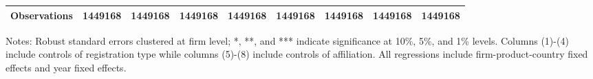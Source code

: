 \begin{table}
\begin{threeparttable}
\begin{tabular}{lcccccccc}
			Observations & 1449168 & 1449168 & 1449168 & 1449168 & 1449168 & 1449168 & 1449168 & 1449168\\
			\bottomrule
		\end{tabular}
		\begin{tablenotes}
			\footnotesize
			\item[Notes:] Robust standard errors clustered at firm level; *, **, and *** indicate significance at 10\%, 5\%, and 1\% levels. Columns (1)-(4) include controls of registration type while columns (5)-(8) include controls of affiliation. All regressions include firm-product-country fixed effects and year fixed effects.
		\end{tablenotes}
	\end{threeparttable}
	\label{tab.robust.ownership}
\end{table}

